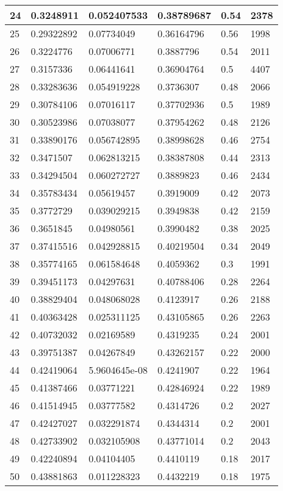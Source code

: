 \begin{longtable}{|l|l|l|l|l|l|}
24 & 0.3248911 & 0.052407533 & 0.38789687 & 0.54 & 2378 \\ \hline 
25 & 0.29322892 & 0.07734049 & 0.36164796 & 0.56 & 1998 \\ \hline 
26 & 0.3224776 & 0.07006771 & 0.3887796 & 0.54 & 2011 \\ \hline 
27 & 0.3157336 & 0.06441641 & 0.36904764 & 0.5 & 4407 \\ \hline 
28 & 0.33283636 & 0.054919228 & 0.3736307 & 0.48 & 2066 \\ \hline 
29 & 0.30784106 & 0.07016117 & 0.37702936 & 0.5 & 1989 \\ \hline 
30 & 0.30523986 & 0.07038077 & 0.37954262 & 0.48 & 2126 \\ \hline 
31 & 0.33890176 & 0.056742895 & 0.38998628 & 0.46 & 2754 \\ \hline 
32 & 0.3471507 & 0.062813215 & 0.38387808 & 0.44 & 2313 \\ \hline 
33 & 0.34294504 & 0.060272727 & 0.3889823 & 0.46 & 2434 \\ \hline 
34 & 0.35783434 & 0.05619457 & 0.3919009 & 0.42 & 2073 \\ \hline 
35 & 0.3772729 & 0.039029215 & 0.3949838 & 0.42 & 2159 \\ \hline 
36 & 0.3651845 & 0.04980561 & 0.3990482 & 0.38 & 2025 \\ \hline 
37 & 0.37415516 & 0.042928815 & 0.40219504 & 0.34 & 2049 \\ \hline 
38 & 0.35774165 & 0.061584648 & 0.4059362 & 0.3 & 1991 \\ \hline 
39 & 0.39451173 & 0.04297631 & 0.40788406 & 0.28 & 2264 \\ \hline 
40 & 0.38829404 & 0.048068028 & 0.4123917 & 0.26 & 2188 \\ \hline 
41 & 0.40363428 & 0.025311125 & 0.43105865 & 0.26 & 2263 \\ \hline 
42 & 0.40732032 & 0.02169589 & 0.4319235 & 0.24 & 2001 \\ \hline 
43 & 0.39751387 & 0.04267849 & 0.43262157 & 0.22 & 2000 \\ \hline 
44 & 0.42419064 & 5.9604645e-08 & 0.4241907 & 0.22 & 1964 \\ \hline 
45 & 0.41387466 & 0.03771221 & 0.42846924 & 0.22 & 1989 \\ \hline 
46 & 0.41514945 & 0.03777582 & 0.4314726 & 0.2 & 2027 \\ \hline 
47 & 0.42427027 & 0.032291874 & 0.4344314 & 0.2 & 2001 \\ \hline 
48 & 0.42733902 & 0.032105908 & 0.43771014 & 0.2 & 2043 \\ \hline 
49 & 0.42240894 & 0.04104405 & 0.4410119 & 0.18 & 2017 \\ \hline 
50 & 0.43881863 & 0.011228323 & 0.4432219 & 0.18 & 1975 \\ \hline 
\end{longtable}